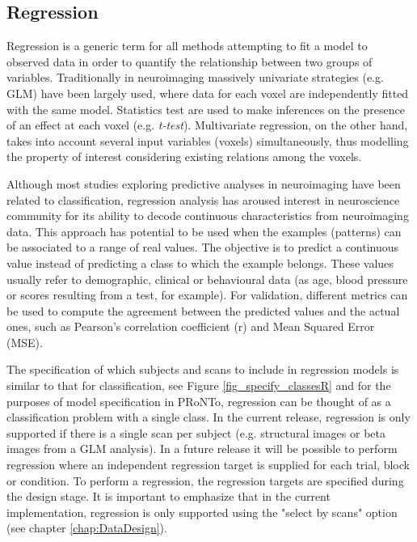\subsection{Regression}

Regression is a generic term for all methods attempting to fit a model to observed data in order to quantify the relationship between two groups of variables. Traditionally in neuroimaging massively univariate strategies (e.g. GLM) have been largely used, where data for each voxel are independently fitted with the same model. Statistics test are used to make inferences on the presence of an effect at each voxel (e.g. \emph{t-test}).  Multivariate regression, on the other hand, takes into account several input variables (voxels) simultaneously, thus modelling the property of interest considering existing relations among the voxels.

Although most studies exploring predictive analyses in neuroimaging have been related to classification, regression analysis has aroused interest in neuroscience community for its ability to decode continuous characteristics from neuroimaging data. This approach has potential to be used when the examples (patterns) can be associated to a range of real values. The objective is to predict a continuous value instead of predicting a class to which the example belongs. These values usually refer to demographic, clinical or behavioural data (as age, blood pressure or scores resulting from a test, for example). For validation, different metrics can be used to compute the agreement between the predicted values and the actual ones, such as Pearson's correlation coefficient (r) and Mean Squared Error (MSE).

The specification of which subjects and scans to include in regression models is similar to that for classification, see Figure  \ref{fig_specify_classesR} and for the purposes of model specification in PRoNTo, regression can be thought of as a classification problem with a single class. In the current release, regression is only supported if there is a single scan per subject (e.g. structural images or beta images from a GLM analysis). In a future release it will be possible to perform regression where an independent regression target is supplied for each trial, block or condition. To perform a regression, the regression targets are specified during the design stage. It is important to emphasize that in the current implementation, regression is only supported using the "select by scans" option (see chapter \ref{chap:DataDesign}).  

